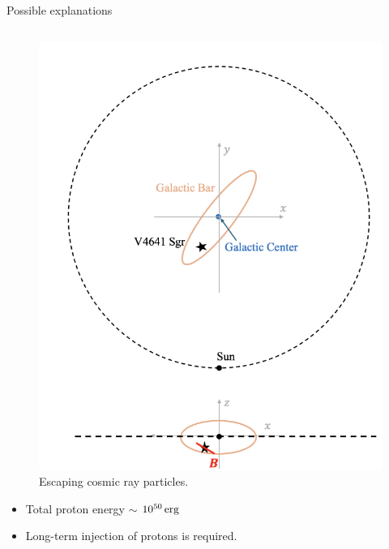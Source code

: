\documentclass[10pt,aspectratio=169,mathserif]{beamer}
\begin{document}
\begin{frame}{Possible explanations}
\begin{columns}[T]
\begin{column}{0.5\textwidth}
\begin{figure}
        \includegraphics[scale=0.25]{Nerenov.png}
        \caption{Escaping cosmic ray particles. \citep{neronov2025multimessenger}}
        \label{fig:confine}
        \end{figure}
      \begin{itemize}
          \item Total proton energy $\sim$ $10^{50}\, \rm erg$
          \item Long-term injection of protons is required.
      \end{itemize}
    
    \end{column}    
  \end{columns}
    
\end{frame}



\end{document}

